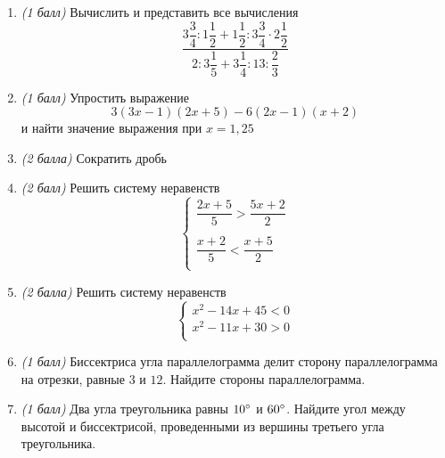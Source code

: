 \documentclass[12pt, a4paper]{article}
\begin{document}
	
	\begin{enumerate}
		\item \textit{(1 балл)} Вычислить и представить все вычисления $$\dfrac{3\dfrac{3}{4}:1\dfrac{1}{2}+1\dfrac{1}{2}:3\dfrac{3}{4}\cdot2\dfrac{1}{2}}{2:3\dfrac{1}{5}+3\dfrac{1}{4}:13:\dfrac{2}{3}}$$
		\item \textit{(1 балл)} Упростить выражение $$3(3x-1)(2x+5)-6(2x-1)(x+2)$$ и найти значение выражения при $x=1,25$
		\item \textit{(2 балла)} Сократить дробь
		\begin{enumerate}[label=\asbuk*)]
		\end{enumerate}
		\item \textit{(2 балл)} Решить систему неравенств 
		$$
		\left\{
		\begin{array}{l}
			\dfrac{2x+5}{5}>\dfrac{5x+2}{2}\\\\
			\dfrac{x+2}{5}<\dfrac{x+5}{2}\\
		\end{array}
		\right.
		$$
		\item \textit{(2 балла)} Решить систему неравенств 
		$$
		\left\{
		\begin{array}{l}
			x^2-14x+45 < 0\\
			x^2-11x+30 > 0\\
		\end{array}
		\right.
		$$
		\item \textit{(1 балл)} Биссектриса угла параллелограмма делит сторону параллелограмма на отрезки, равные $3$ и $12$. Найдите стороны параллелограмма.
		\item \textit{(1 балл)} Два угла треугольника равны $10\degree$ и $60\degree$. Найдите угол между высотой и биссектрисой, проведенными из вершины третьего угла треугольника.
	\end{enumerate}
\end{document}
